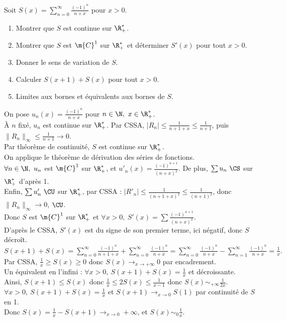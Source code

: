 \documentclass[11pt]{article}
\begin{document}
\begin{ex}{}{}
    Soit $S(x)=\sum_{n=0}^{\infty}\frac{(-1)^n}{n+x}$ pour $x>0$.
    \begin{enumerate}
        \item Montrer que $S$ est continue sur $\R_+^*$.
        \item Montrer que $S$ est $\m{C}^1$ sur $\R_+^*$ et déterminer $S'(x)$ pour tout $x>0$.
        \item Donner le sens de variation de $S$.
        \item Calculer $S(x+1)+S(x)$ pour tout $x>0$.
        \item Limites aux bornes et équivalents aux bornes de $S$.
    \end{enumerate}
    \tcblower
    On pose $u_n(x)=\frac{(-1)^n}{n+x}$ pour $n\in\N, ~ x\in\R_+^*$.\\
     À $n$ fixé, $u_n$ est continue sur $\R_+^*$. Par CSSA, $|R_n|\leq\frac{1}{n+1+x}\leq\frac{1}{n+1}$, puis $\|R_n\|_\infty\leq\frac{1}{n+1}\to0$.\\
    Par théorème de continuité, $S$ est continue sur $\R_+^*$.\\
     On applique le théorème de dérivation des séries de fonctions.\\
    $\forall n \in \N, ~ u_n$ est $\m{C}^1$ sur $\R_+^*$, et $u'_n(x)=\frac{(-1)^{n+1}}{(n+x)^2}$. De plus, $\sum u_n ~ \CS$ sur $\R_+^*$ d'après 1.\\
    Enfin, $\sum u'_n ~ \CU$ sur $\R_+^*$, par CSSA : $|R'_n|\leq\frac{1}{(n+1+x)^2}\leq\frac{1}{(n+1)^2}$, donc $\|R_n\|_\infty\to0$, $\CU$.\\
    Donc $S$ est $\m{C}^1$ sur $\R_+^*$ et $\forall x > 0, ~ S'(x)=\sum\frac{(-1)^{n+1}}{(n+x)^2}$.\\
     D'après le CSSA, $S'(x)$ est du signe de son premier terme, ici négatif, donc $S$ décroît.\\
     $S(x+1)+S(x)=\sum_{n=0}^\infty\frac{(-1)^n}{n+1+x}+\sum_{n=0}^\infty\frac{(-1)^n}{n+x}=\sum_{n=0}^\infty\frac{(-1)^n}{n+x}-\sum_{n=1}^\infty\frac{(-1)^n}{n+x}=\frac{1}{x}.$\\
     Par CSSA, $\frac{1}{x}\geq S(x) \geq 0$ donc $S(x)\to_{x\to+\infty}0$ par encadrement.\\
    Un équivalent en l'infini : $\forall x > 0, ~ S(x+1)+S(x)=\frac{1}{x}$ et décroissante.\\
    Ainsi, $S(x+1)\leq S(x)$ donc $\frac{1}{x}\leq 2S(x)\leq \frac{1}{x-1}$ donc $S(x)\sim_{+\infty}\frac{1}{2x}$.\\
    $\forall x > 0, ~ S(x+1)+S(x)=\frac{1}{x}$ et $S(x+1)\to_{x\to0} S(1)$ par continuité de $S$ en 1.\\
    Donc $S(x)=\frac{1}{x}-S(x+1)\to_{x\to0} +\infty$, et $S(x)\sim_0 \frac{1}{x}$.
\end{ex}
\end{document}
